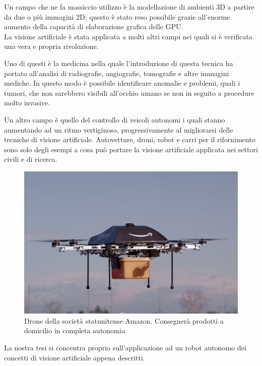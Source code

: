 Un campo che ne fa massiccio utilizzo è la modellazione di ambienti 3D a partire 
da due o più immagini 2D; questo è stato reso possibile 
grazie all'enorme aumento della capacità di elaborazione grafica delle GPU.\\
La visione artificiale è stata applicata a molti altri campi nei quali si è verificata 
una vera e propria rivoluzione.

Uno di questi è la medicina nella quale l'introduzione di questa tecnica ha portato
all'analisi di radiografie, angiografie,
tomografie e altre immagini mediche. In questo modo è possibile identificare anomalie e 
problemi, quali i tumori, che non sarebbero visibili all'occhio umano 
se non in seguito a procedure molto invasive.

Un altro campo è quello del controllo di veicoli autonomi i quali stanno aumentando
ad un ritmo vertiginoso, progressivamente al migliorarsi delle tecniche di 
visione artificiale. Autovetture, droni, robot e carri per il rifornimento 
sono solo degli esempi a cosa può portare la visione artificiale applicata nei settori 
civili e di ricerca.
\begin{figure}[!htb] \center
\includegraphics[scale=0.2]{immagini/amazon-air.png}
\caption{Drone della società statunitense Amazon. Consegnerà prodotti a domicilio in completa autonomia} 
\end{figure}
La nostra tesi si concentra proprio sull'applicazione ad un robot autonomo dei 
concetti di visione artificiale appena descritti.

